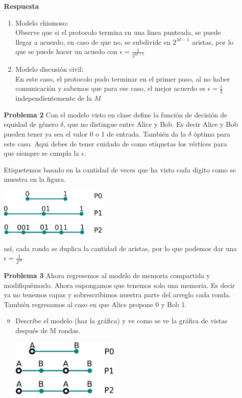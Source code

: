 \documentclass{article}
\begin{document}
\begin{enumerate}
\item[\bf{Respuesta}]
\begin{enumerate}
\item Modelo chismoso:\\
  Observe que si el protocolo termina en una linea punteada, se puede llegar a acuerdo, en caso de que no, se subdivide en $2^{M-1}$ aristas, por lo que se puede hacer un acuedo con $\epsilon = \frac{1}{2^{M-1}}$
\item Modelo discusión civil:\\
  En este caso, el protocolo pudo terminar en el primer paso, al no haber comunicación y sabemos que para ese caso, el mejor acuerdo es $\epsilon=\frac{1}{3}$ independientemente de la $M$
\end{enumerate}

\item[\bf{Problema 2}] Con el modelo visto en clase define la función de decisión de equidad de género $\delta$, que no distingue entre Alice y Bob. Es decir Alice y Bob pueden tener ya sea el valor 0 o 1 de entrada. También da la $\delta$ óptima para este caso. Aqui debes de tener cuidado de como etiquetas los vértices para que siempre se cumpla la $\epsilon$.

Etiquetemos basado en la cantidad de veces que ha visto cada digito como se muestra en la figura.

\begin{center}
  \includegraphics[width=200px]{t3f3.png}
\end{center}

así, cada ronda se duplica la cantidad de aristas, por lo que podemos dar una $\epsilon=\frac{1}{2^M}$

\item[\bf{Problema 3}] Ahora regresemos al modelo de memoria compartida y modifiquémoslo. Ahora supongamos que tenemos solo una memoria. Es decir ya no tenemos capas y sobrescribimos nuestra parte del arreglo cada ronda. También regresamos al caso en que Alice propone 0 y Bob 1.
\begin{itemize}
\item Describe el modelo (haz la gráfica) y ve como se ve la gráfica de vistas después de M rondas.

\begin{center}
  \includegraphics[width=200px]{t3f4.png}
\end{center}


\end{itemize}
\end{enumerate}
\end{document}
